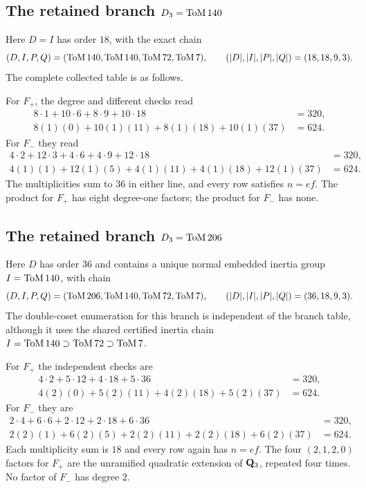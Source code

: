 \subsection[The retained branch D3 = ToM 140]{The retained branch
  \texorpdfstring{$D_3=\mathrm{ToM}\,140$}{D3 = ToM 140}}

Here $D=I$ has order $18$, with the exact chain
\begin{equation}
 (D,I,P,Q)=(\mathrm{ToM}\,140,\mathrm{ToM}\,140,\mathrm{ToM}\,72,\mathrm{ToM}\,7),
 \qquad (|D|,|I|,|P|,|Q|)=(18,18,9,3).
 \label{eq:tom140-chain}
\end{equation}
The complete collected table is as follows.

\FloatBarrier

\FloatBarrier

For $F_+$, the degree and different checks read
\begin{align*}
8\cdot1+10\cdot6+8\cdot9+10\cdot18&=320,\\
8(1)(0)+10(1)(11)+8(1)(18)+10(1)(37)&=624.
\end{align*}
For $F_-$ they read
\begin{align*}
4\cdot2+12\cdot3+4\cdot6+4\cdot9+12\cdot18&=320,\\
4(1)(1)+12(1)(5)+4(1)(11)+4(1)(18)+12(1)(37)&=624.
\end{align*}
The multiplicities sum to $36$ in either line, and every row satisfies
$n=ef$.  The product for $F_+$ has eight degree-one factors; the product for
$F_-$ has none.

\subsection[The retained branch D3 = ToM 206]{The retained branch
  \texorpdfstring{$D_3=\mathrm{ToM}\,206$}{D3 = ToM 206}}

Here $D$ has order $36$ and contains a unique normal embedded inertia group
$I=\mathrm{ToM}\,140$, with chain
\begin{equation}
 (D,I,P,Q)=(\mathrm{ToM}\,206,\mathrm{ToM}\,140,\mathrm{ToM}\,72,\mathrm{ToM}\,7),
 \qquad (|D|,|I|,|P|,|Q|)=(36,18,9,3).
 \label{eq:tom206-chain}
\end{equation}
The double-coset enumeration for this branch is independent of the
 branch table, although it uses the shared certified inertia chain
$I=\mathrm{ToM}\,140\supset\mathrm{ToM}\,72\supset\mathrm{ToM}\,7$.

\FloatBarrier

\FloatBarrier

For $F_+$ the independent checks are
\begin{align*}
4\cdot2+5\cdot12+4\cdot18+5\cdot36&=320,\\
4(2)(0)+5(2)(11)+4(2)(18)+5(2)(37)&=624.
\end{align*}
For $F_-$ they are
\begin{align*}
2\cdot4+6\cdot6+2\cdot12+2\cdot18+6\cdot36&=320,\\
2(2)(1)+6(2)(5)+2(2)(11)+2(2)(18)+6(2)(37)&=624.
\end{align*}
Each multiplicity sum is $18$ and every row again has $n=ef$.  The four
$(2,1,2,0)$ factors for $F_+$ are the unramified quadratic extension of
$\mathbf{Q}_{3}$, repeated four times.  No factor of $F_-$ has degree $2$.

